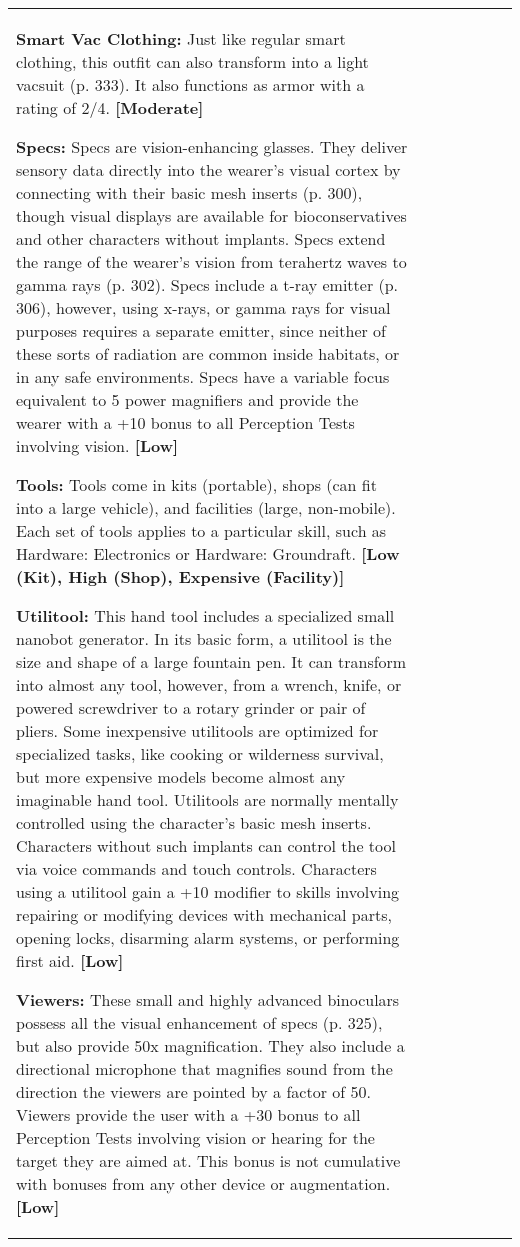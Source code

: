\begin{tabular}{|l|l|l|l|l|l|l|}
\textbf{Smart Vac Clothing:} Just like regular smart clothing, this outfit can also transform into a light vacsuit (p. 333). It also functions as armor with a rating of 2/4. \textbf{[Moderate]} 

\textbf{Specs:} Specs are vision-enhancing glasses. They deliver sensory data directly into the wearer’s visual cortex by connecting with their basic mesh inserts (p. 300), though visual displays are available for bioconservatives and other characters without implants. Specs extend the range of the wearer’s vision from terahertz waves to gamma rays (p. 302). Specs include a t-ray emitter (p. 306), however, using x-rays, or gamma rays for visual purposes requires a separate emitter, since neither of these sorts of radiation are common inside habitats, or in any safe environments. Specs have a variable focus equivalent to 5 power magnifiers and provide the wearer with a +10 bonus to all Perception Tests involving vision. \textbf{[Low]} 

\textbf{Tools:} Tools come in kits (portable), shops (can fit into a large vehicle), and facilities (large, non-mobile). Each set of tools applies to a particular skill, such as Hardware: Electronics or Hardware: Groundraft. \textbf{[Low (Kit), High (Shop), Expensive (Facility)]} 

\textbf{Utilitool:} This hand tool includes a specialized small nanobot generator. In its basic form, a utilitool is the size and shape of a large fountain pen. It can transform into almost any tool, however, from a wrench, knife, or powered screwdriver to a rotary grinder or pair of pliers. Some inexpensive utilitools are optimized for specialized tasks, like cooking or wilderness survival, but more expensive models become almost any imaginable hand tool. Utilitools are normally mentally controlled using the character’s basic mesh inserts. Characters without such implants can control the tool via voice commands and touch controls. Characters using a utilitool gain a +10 modifier to skills involving repairing or modifying devices with mechanical parts, opening locks, disarming alarm systems, or performing first aid. \textbf{[Low]} 

\textbf{Viewers:} These small and highly advanced binoculars possess all the visual enhancement of specs (p. 325), but also provide 50x magnification. They also include a directional microphone that magnifies sound from the direction the viewers are pointed by a factor of 50. Viewers provide the user with a +30 bonus to all Perception Tests involving vision or hearing for the target they are aimed at. This bonus is not cumulative with bonuses from any other device or augmentation. \textbf{[Low]} 




\end{tabular}

